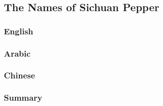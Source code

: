 \subsection{The Names of Sichuan Pepper}

\subsubsection{English}



\subsubsection{Arabic}



\subsubsection{Chinese}



\subsubsection{Summary}












